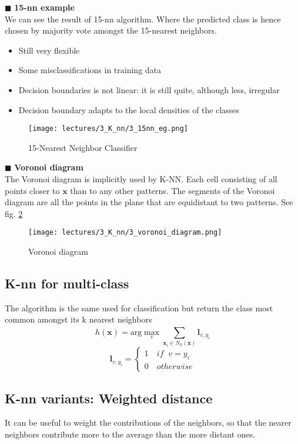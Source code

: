 \documentclass[../main.tex]{subfiles}
\begin{document}
\noindent$\blacksquare$ \textbf{15-nn example}\\
We can see the result of 15-nn algorithm. Where the predicted class is hence chosen by
majority vote amongst the 15-nearest neighbors.\\

\begin{itemize}
    \item Still very flexible
    \item Some misclassifications in training data
    \item Decision boundaries is not linear: it is still quite, although less, irregular
    \item Decision boundary adapts to the local densities of the classes
\end{itemize}

\begin{figure}[H]
    \centering
    \texttt{[image: lectures/3\_K\_nn/3\_15nn\_eg.png]}
    \caption{15-Nearest Neighbor Classifier}
    \label{fig:3_15nn_eg}
\end{figure}

\noindent$\blacksquare$ \textbf{Voronoi diagram}\\
The Voronoi diagram is implicitly used by K-NN. Each cell consisting of all points closer to $\mathbf{x}$ than to any other patterns. The segments of the Voronoi diagram are all the points in the plane that are equidistant to two patterns. See fig. \ref{fig:voronoi_diagram}
\begin{figure}[h]
    \centering
    \texttt{[image: lectures/3\_K\_nn/3\_voronoi\_diagram.png]}
    \caption{Voronoi diagram}
    \label{fig:voronoi_diagram}
\end{figure}
\subsection{K-nn for multi-class}
The algorithm is the same used for classification but return the class most common amongst its k nearest neighbors
\[ 
    h(\mathbf{x}) = \mbox{arg}\max_{v} \sum_{\mathbf{x}_i \in N_k(\mathbf{x})}^{}\mathbf{l}_{v, y_i}
\]
\[
    \mathbf{l}_{v, y_i} = \left\{
                \begin{array}{ll}
                  1 \quad if \;\; v = y_i\\
                  0 \quad otherwise
                \end{array}
              \right.
\]

\subsection{K-nn variants: Weighted distance}
It can be useful to weight the contributions of the neighbors, so that the nearer neighbors contribute more to the average than the more distant ones.
\end{document}
